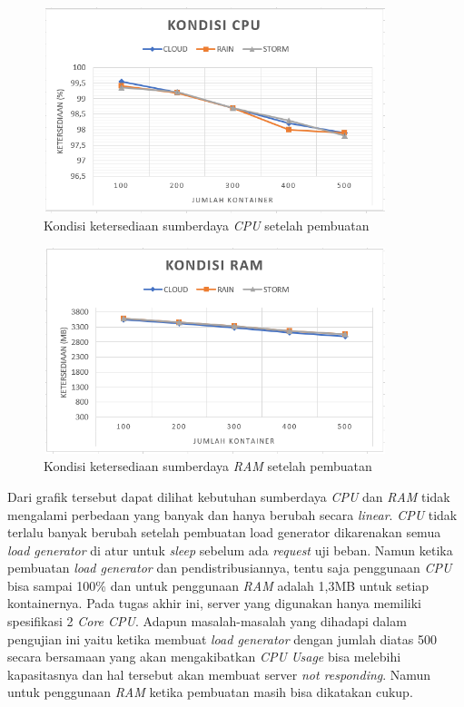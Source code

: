 				\begin{figure}[H]
					\centering
					\includegraphics[width=10cm,height=6cm]{Images/C-5/pembuatancpu.PNG}
					\caption{Kondisi ketersediaan sumberdaya \textit{CPU} setelah pembuatan}
					\label{pembuatancpu}
				\end{figure}
				
				\begin{figure}[H]
					\centering
					\includegraphics[width=10cm,height=6cm]{Images/C-5/pembuatanram.PNG}
					\caption{Kondisi ketersediaan sumberdaya \textit{RAM} setelah pembuatan}
					\label{pembuatanram}
				\end{figure}
				
				Dari grafik tersebut dapat dilihat kebutuhan sumberdaya \textit{CPU} dan \textit{RAM} tidak mengalami perbedaan yang banyak dan hanya berubah secara \textit{linear}. \textit{CPU} tidak terlalu banyak berubah setelah pembuatan load generator dikarenakan semua \textit{load generator} di atur untuk \textit{sleep} sebelum ada \textit{request} uji beban. Namun ketika pembuatan \textit{load generator} dan pendistribusiannya, tentu saja penggunaan \textit{CPU} bisa sampai 100\% dan untuk penggunaan \textit{RAM} adalah 1,3MB untuk setiap kontainernya. Pada tugas akhir ini, server yang digunakan hanya memiliki spesifikasi 2 \textit{Core CPU}. Adapun masalah-masalah yang dihadapi dalam pengujian ini yaitu ketika membuat \textit{load generator} dengan jumlah diatas 500 secara bersamaan yang akan mengakibatkan \textit{CPU Usage} bisa melebihi kapasitasnya dan hal tersebut akan membuat server \textit{not responding}. Namun untuk penggunaan \textit{RAM} ketika pembuatan masih bisa dikatakan cukup.
				
